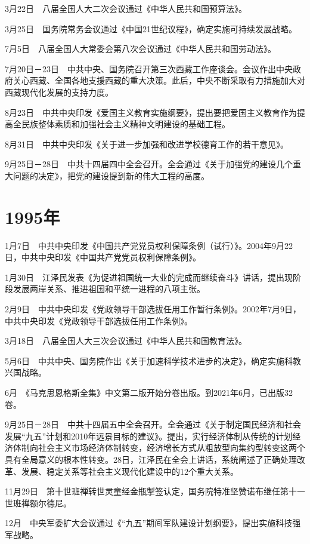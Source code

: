 \documentclass[10pt,a4paper,twocolumn]{book}
\begin{document}
3月22日　八届全国人大二次会议通过《中华人民共和国预算法》。

3月25日　国务院常务会议通过《中国21世纪议程》，确定实施可持续发展战略。

7月5日　八届全国人大常委会第八次会议通过《中华人民共和国劳动法》。

7月20日－23日　中共中央、国务院召开第三次西藏工作座谈会。会议作出中央政府关心西藏、全国各地支援西藏的重大决策。此后，中央不断采取有力措施加大对西藏现代化发展的支持力度。

8月23日　中共中央印发《爱国主义教育实施纲要》，提出要把爱国主义教育作为提高全民族整体素质和加强社会主义精神文明建设的基础工程。

8月31日　中共中央印发《关于进一步加强和改进学校德育工作的若干意见》。

9月25日－28日　中共十四届四中全会召开。全会通过《关于加强党的建设几个重大问题的决定》，把党的建设提到新的伟大工程的高度。

\section{1995年}

1月7日　中共中央印发《中国共产党党员权利保障条例（试行）》。2004年9月22日，中共中央印发《中国共产党党员权利保障条例》。

1月30日　江泽民发表《为促进祖国统一大业的完成而继续奋斗》讲话，提出现阶段发展两岸关系、推进祖国和平统一进程的八项主张。

2月9日　中共中央印发《党政领导干部选拔任用工作暂行条例》。2002年7月9日，中共中央印发《党政领导干部选拔任用工作条例》。

3月18日　八届全国人大三次会议通过《中华人民共和国教育法》。

5月6日　中共中央、国务院作出《关于加速科学技术进步的决定》，确定实施科教兴国战略。

6月　《马克思恩格斯全集》中文第二版开始分卷出版。到2021年6月，已出版32卷。

9月25日－28日　中共十四届五中全会召开。全会通过《关于制定国民经济和社会发展“九五”计划和2010年远景目标的建议》。提出，实行经济体制从传统的计划经济体制向社会主义市场经济体制转变，经济增长方式从粗放型向集约型转变这两个具有全局意义的根本性转变。28日，江泽民在全会上讲话，系统阐述了正确处理改革、发展、稳定关系等社会主义现代化建设中的12个重大关系。

11月29日　第十世班禅转世灵童经金瓶掣签认定，国务院特准坚赞诺布继任第十一世班禅额尔德尼。

12月　中央军委扩大会议通过《“九五”期间军队建设计划纲要》，提出实施科技强军战略。
\end{document}
